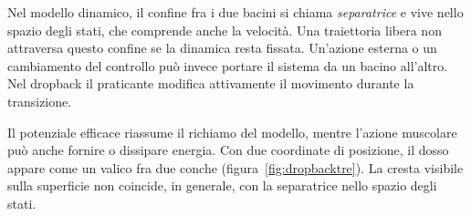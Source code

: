 \documentclass[11pt]{article}
\begin{document}
Nel modello dinamico, il confine fra i due bacini si chiama \emph{separatrice} e vive nello spazio degli stati, che comprende anche la velocità. Una traiettoria libera non attraversa questo confine se la dinamica resta fissata. Un'azione esterna o un cambiamento del controllo può invece portare il sistema da un bacino all'altro. Nel dropback il praticante modifica attivamente il movimento durante la transizione.

Il potenziale efficace riassume il richiamo del modello, mentre l'azione muscolare può anche fornire o dissipare energia. Con due coordinate di posizione, il dosso appare come un valico fra due conche (figura~\ref{fig:dropbacktre}). La cresta visibile sulla superficie non coincide, in generale, con la separatrice nello spazio degli stati.

\begin{figure}[htbp]
\centering
{}
\end{figure}
\end{document}
